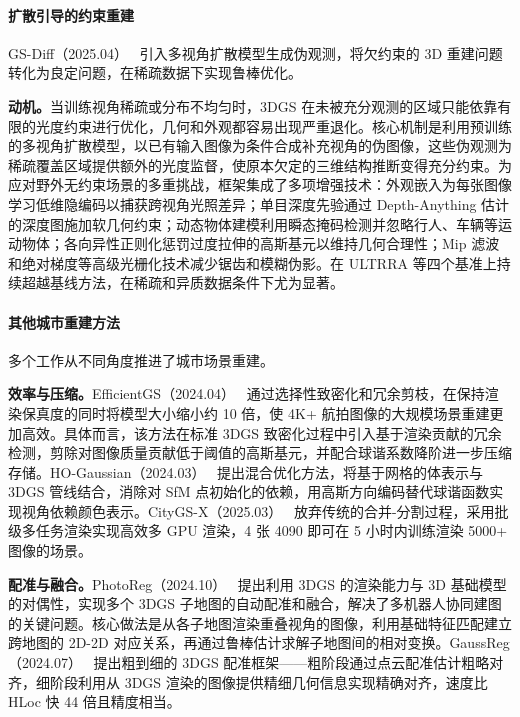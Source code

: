 \paragraph{扩散引导的约束重建}

GS-Diff（2025.04）~\cite{2504_01960} 引入多视角扩散模型生成伪观测，将欠约束的 3D 重建问题转化为良定问题，在稀疏数据下实现鲁棒优化。

\textbf{动机。}当训练视角稀疏或分布不均匀时，3DGS 在未被充分观测的区域只能依靠有限的光度约束进行优化，几何和外观都容易出现严重退化。核心机制是利用预训练的多视角扩散模型，以已有输入图像为条件合成补充视角的伪图像，这些伪观测为稀疏覆盖区域提供额外的光度监督，使原本欠定的三维结构推断变得充分约束。为应对野外无约束场景的多重挑战，框架集成了多项增强技术：外观嵌入为每张图像学习低维隐编码以捕获跨视角光照差异；单目深度先验通过 Depth-Anything 估计的深度图施加软几何约束；动态物体建模利用瞬态掩码检测并忽略行人、车辆等运动物体；各向异性正则化惩罚过度拉伸的高斯基元以维持几何合理性；Mip 滤波和绝对梯度等高级光栅化技术减少锯齿和模糊伪影。在 ULTRRA 等四个基准上持续超越基线方法，在稀疏和异质数据条件下尤为显著。

\paragraph{其他城市重建方法}

多个工作从不同角度推进了城市场景重建。

\textbf{效率与压缩。}EfficientGS（2024.04）~\cite{2404_12777} 通过选择性致密化和冗余剪枝，在保持渲染保真度的同时将模型大小缩小约 10 倍，使 4K+ 航拍图像的大规模场景重建更加高效。具体而言，该方法在标准 3DGS 致密化过程中引入基于渲染贡献的冗余检测，剪除对图像质量贡献低于阈值的高斯基元，并配合球谐系数降阶进一步压缩存储。HO-Gaussian（2024.03）~\cite{2403_20032} 提出混合优化方法，将基于网格的体表示与 3DGS 管线结合，消除对 SfM 点初始化的依赖，用高斯方向编码替代球谐函数实现视角依赖颜色表示。CityGS-X（2025.03）~\cite{2503_23044} 放弃传统的合并-分割过程，采用批级多任务渲染实现高效多 GPU 渲染，4 张 4090 即可在 5 小时内训练渲染 5000+ 图像的场景。

\textbf{配准与融合。}PhotoReg（2024.10）~\cite{2410_05044} 提出利用 3DGS 的渲染能力与 3D 基础模型的对偶性，实现多个 3DGS 子地图的自动配准和融合，解决了多机器人协同建图的关键问题。核心做法是从各子地图渲染重叠视角的图像，利用基础特征匹配建立跨地图的 2D-2D 对应关系，再通过鲁棒估计求解子地图间的相对变换。GaussReg（2024.07）~\cite{2407_05254} 提出粗到细的 3DGS 配准框架——粗阶段通过点云配准估计粗略对齐，细阶段利用从 3DGS 渲染的图像提供精细几何信息实现精确对齐，速度比 HLoc 快 44 倍且精度相当。

